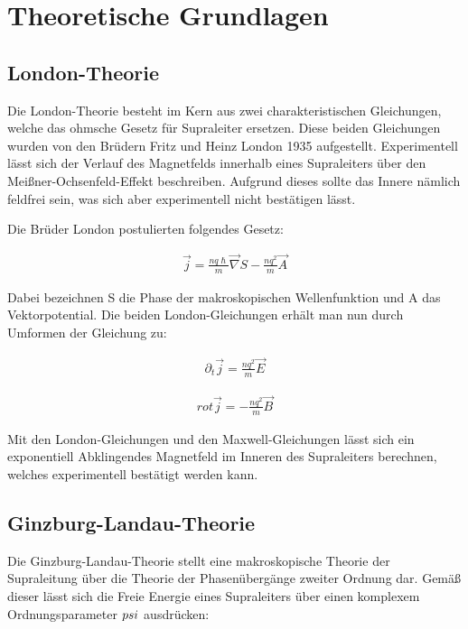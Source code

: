 \section{Theoretische Grundlagen}
\subsection{London-Theorie}

Die London-Theorie besteht im Kern aus zwei charakteristischen Gleichungen, welche das ohmsche Gesetz für Supraleiter ersetzen. Diese beiden Gleichungen wurden von den Brüdern Fritz und Heinz London 1935 aufgestellt. Experimentell lässt sich der Verlauf des Magnetfelds innerhalb eines Supraleiters über den Meißner-Ochsenfeld-Effekt beschreiben. Aufgrund dieses sollte das Innere nämlich feldfrei sein, was sich aber experimentell nicht bestätigen lässt.

Die Brüder London postulierten folgendes Gesetz:

\begin{align}
\overrightarrow{j}=\frac{nq\hslash}{m}\overrightarrow{\nabla}S - \frac{nq^{2}}{m}\overrightarrow{A}
\end{align}

Dabei bezeichnen S die Phase der makroskopischen Wellenfunktion und A das Vektorpotential. Die beiden London-Gleichungen erhält man nun durch Umformen der Gleichung zu:

\begin{align}
\partial_t \overrightarrow{j}=\frac{nq^2}{m}\overrightarrow{E}
\end{align}

\begin{align}
rot \overrightarrow{j}=-\frac{nq^2}{m}\overrightarrow{B}
\end{align}

Mit den London-Gleichungen und den Maxwell-Gleichungen lässt sich ein exponentiell Abklingendes Magnetfeld im Inneren des Supraleiters berechnen, welches experimentell bestätigt werden kann. 



\subsection{Ginzburg-Landau-Theorie}

Die Ginzburg-Landau-Theorie stellt eine makroskopische Theorie der Supraleitung über die Theorie der Phasenübergänge zweiter Ordnung dar. Gemäß dieser lässt sich die Freie Energie eines Supraleiters über einen komplexem Ordnungsparameter $\\psi$ ausdrücken:

